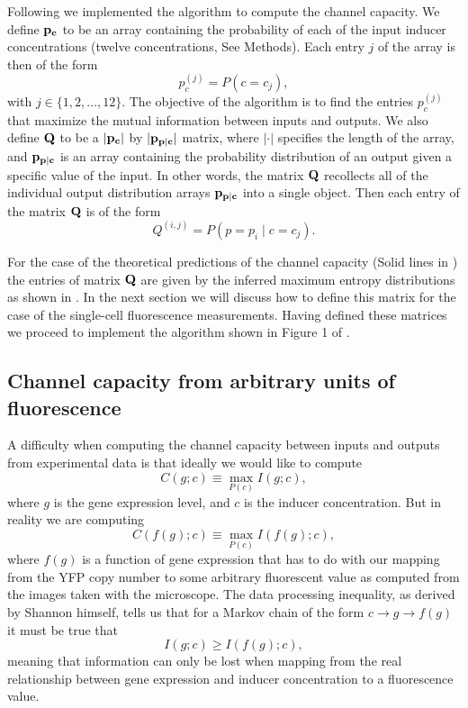 Following \cite{Blahut1972} we implemented the algorithm to compute the channel
capacity. We define $\mathbf{p_c}$ to be an array containing the probability of each
of the input inducer concentrations (twelve concentrations, See Methods).
Each entry $j$ of the array is then of the form
\begin{equation}
  p_c^{(j)} = P(c = c_j),
\end{equation}
with $j \in \{1, 2, \ldots, 12 \}$. The objective of the algorithm is to find
the entries $p_c^{(j)}$ that maximize the mutual information between inputs and
outputs. We also define $\mathbf{Q}$ to be a $\vert \mathbf{p_c} \vert$ by
$\vert \mathbf{p_{p \mid c}} \vert$ matrix, where $\vert \cdot \vert$ specifies the
length of the array, and $\mathbf{p_{p \mid c}}$ is an array containing the
probability distribution of an output given a specific value of the input. In
other words, the matrix $\mathbf{Q}$ recollects all of the individual output
distribution arrays $\mathbf{p_{p \mid c}}$ into a single object. Then each entry
of the matrix $\mathbf{Q}$ is of the form
\begin{equation}
  Q^{(i, j)} = P(p = p_i \mid c = c_j).
\end{equation}

For the case of the theoretical predictions of the channel capacity (Solid
lines in ) the entries of matrix $\mathbf{Q}$ are given by the
inferred maximum entropy distributions as shown in . In the
next section we will discuss how to define this matrix for the case of the
single-cell fluorescence measurements. Having defined these matrices we proceed
to implement the algorithm shown in Figure 1 of \cite{Blahut1972}.

\subsection{Channel capacity from arbitrary units of fluorescence}

A difficulty when computing the channel capacity between inputs and outputs from
experimental data is that ideally we would like to compute
\begin{equation}
C(g; c) \equiv \max_{P(c)} I(g; c),
\end{equation}
where $g$ is the gene expression level, and $c$ is the inducer concentration.
But in reality we are computing
\begin{equation}
C(f(g); c) \equiv \max_{P(c)} I(f(g); c),
\end{equation}
where $f(g)$ is a function of gene expression that has to do with our mapping
from the YFP copy number to some arbitrary fluorescent value as computed from
the images taken with the microscope. The data processing inequality, as derived
by Shannon himself, tells us that for a Markov chain of the form $c \rightarrow
g \rightarrow f(g)$ it must be true that \cite{Shannon1948}
\begin{equation}
I(g; c) \geq I(f(g); c),
\end{equation}
meaning that information can only be lost when mapping from the real
relationship between gene expression and inducer concentration to a fluorescence
value.


